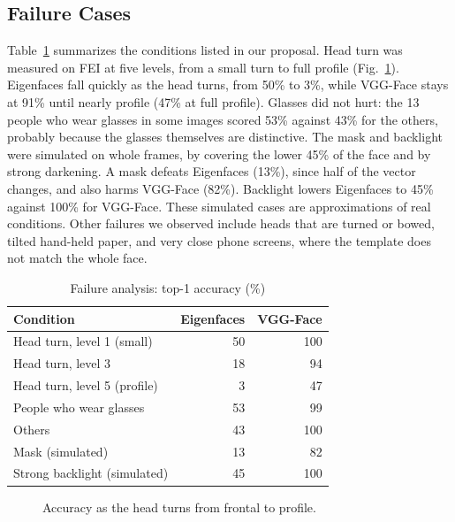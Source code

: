 \documentclass[conference,a4paper]{IEEEtran}
\begin{document}
\subsection{Failure Cases}
Table~\ref{tab:fail} summarizes the conditions listed in our proposal. Head turn was measured on FEI at five levels, from a small turn to full profile (Fig.~\ref{fig:turn}). Eigenfaces fall quickly as the head turns, from 50\% to 3\%, while VGG-Face stays at 91\% until nearly profile (47\% at full profile). Glasses did not hurt: the 13 people who wear glasses in some images scored 53\% against 43\% for the others, probably because the glasses themselves are distinctive. The mask and backlight were simulated on whole frames, by covering the lower 45\% of the face and by strong darkening. A mask defeats Eigenfaces (13\%), since half of the vector changes, and also harms VGG-Face (82\%). Backlight lowers Eigenfaces to 45\% against 100\% for VGG-Face. These simulated cases are approximations of real conditions. Other failures we observed include heads that are turned or bowed, tilted hand-held paper, and very close phone screens, where the template does not match the whole face.

\begin{table}[t]
\caption{Failure analysis: top-1 accuracy (\%)}
\label{tab:fail}
\centering\footnotesize
\begin{tabular}{@{}lrr@{}}
\toprule
Condition & Eigenfaces & VGG-Face \\
\midrule
Head turn, level 1 (small) & 50 & 100 \\
Head turn, level 3 & 18 & 94 \\
Head turn, level 5 (profile) & 3 & 47 \\
People who wear glasses & 53 & 99 \\
Others & 43 & 100 \\
Mask (simulated) & 13 & 82 \\
Strong backlight (simulated) & 45 & 100 \\
\bottomrule
\end{tabular}
\end{table}

\begin{figure}[t]
\centering
{}
\caption{Accuracy as the head turns from frontal to profile.}
\label{fig:turn}
\end{figure}
\end{document}
